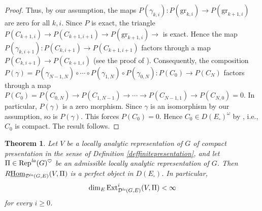 \documentclass[a4paper,10pt]{amsart}
\newtheorem{theorem}{Theorem}[section]
\theoremstyle{remark}
\theoremstyle{definition}
\theoremstyle{plain}
\numberwithin{equation}{section}
\newcommand{\calD}{{\mathcal D}}
\newcommand{\Ext}{{\rm Ext}}
\newcommand{\Hom}{{\rm Hom}}
\newcommand{\la}{{\it la}}
\newcommand{\Rep}{{\rm Rep}}
\begin{document}
\begin{proof}
Thus, by our assumption, the maps $P(\gamma_{k,i}):P(\mathrm{gr}_{k,i})\rightarrow P(\mathrm{gr}_{k+1,i})$ are zero for all $k,i$. Since $P$ is exact, the triangle $P(C_{k+1,i})\rightarrow P(C_{k+1,i+1})\rightarrow P(\mathrm{gr}_{k+1,i})\rightarrow $ is exact. Hence the map $P(\gamma_{k,i+1}):P(C_{k,i+1})\rightarrow P(C_{k+1,i+1})$ factors through a map $P(C_{k,i+1})\rightarrow P(C_{k+1,i})$ (see the proof of \cite[\href{https://stacks.math.columbia.edu/tag/0149}{Tag 0149}]{stacks-project}). Consequently, the composition $P(\gamma)=P(\gamma_{N-1,N})\circ\cdots\circ P(\gamma_{1,N})\circ P(\gamma_{0,N}):P(C_0)\rightarrow P(C_N)$ factors through a map $P(C_0)=P(C_{0,N})\rightarrow P(C_{1,N-1})\rightarrow \cdots \rightarrow P(C_{N-1,1})\rightarrow P(C_{N,0})=0$. In particular, $P(\gamma)$ is a zero morphism. Since $\gamma$ is an isomorphism by our assumption, so is $P(\gamma)$. This forces $P(C_0)=0$. Hence $C_0\in D(E_{\square})^{\omega}$ by \cite[\href{https://stacks.math.columbia.edu/tag/05RK}{Tag 05RK}]{stacks-project}, i.e., $C_0$ is compact. The result follows.
\end{proof}
\begin{theorem}\label{thm:finite-presentation-perfect}
	Let $V$ be a locally analytic representation of $G$ of compact presentation in the sense of Definition \ref{deffinitepresentation},
	and let $\Pi\in \Rep^{\la}(G)^{\heartsuit}$ be an admissible locally analytic representation of $G$. Then $R\underline{\Hom}_{\calD^{\la}(G,E)}(V,\Pi)$ is a perfect object in $D(E_\square)$. In particular,
	\[\dim_E\Ext^i_{\calD^{\la}(G,E)}(V,\Pi)<\infty\] 
	for every $i\geq0$.
\end{theorem}
\end{document}
